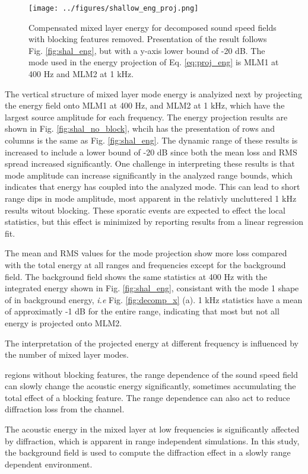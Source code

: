 \documentclass[preprint,NumberedRefs]{JASA}
\begin{document}
\begin{figure}
\texttt{[image: ../figures/shallow\_eng\_proj.png]}
    \caption{Compensated mixed layer energy for decomposed sound speed fields with blocking features removed. Presentation of the result follows Fig. \ref{fig:shal_eng}, but with a y-axis lower bound of -20 dB. The mode used in the energy projection of Eq. \eqref{eq:proj_eng} is MLM1 at 400 Hz and MLM2 at 1 kHz.}
    \label{fig:shal_proj}
\end{figure}
The vertical structure of mixed layer mode energy is analyized next by projecting the energy field onto MLM1 at 400 Hz, and MLM2 at 1 kHz, which have the largest source amplitude for each frequency. The energy projection results are shown in Fig. \ref{fig:shal_no_block}, whcih has the presentation of rows and columns is the same as Fig. \ref{fig:shal_eng}. The dynamic range of these results is increased to include a lower bound of -20 dB since both the mean loss and RMS spread increased significantly. One challenge in interpreting these results is that mode amplitude can increase significantly in the analyzed range bounds, which indicates that energy has coupled into the analyzed mode. This can lead to short range dips in mode amplitude, most apparent in the relativly uncluttered 1 kHz results witout blocking. These sporatic events are expected to effect the local statistics, but this effect is minimized by reporting results from a linear regression fit.

The mean and RMS values for the mode projection show more loss compared with the total energy at all ranges and frequencies except for the background field. The background field shows the same statistics at 400 Hz with the integrated energy shown in Fig. \ref{fig:shal_eng}, consistant with the mode 1 shape of in background energy, \emph{i.e} Fig. \ref{fig:decomp_x} (a). 1 kHz statistics have a mean of approximatly -1 dB for the entire range, indicating that most but not all energy is projected onto MLM2.

The interpretation of the projected energy at different frequency is influenced by the number of mixed layer modes.


 regions without blocking features, the range dependence of the sound speed field can slowly change the acoustic energy significantly, sometimes accumulating the total effect of a blocking feature. The range dependence can also act to reduce diffraction loss from the channel.

The acoustic energy in the mixed layer at low frequencies is significantly affected by diffraction, which is apparent in range independent simulations. In this study, the background field is used to compute the diffraction effect in a slowly range dependent environment.
\end{document}
